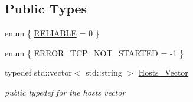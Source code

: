 \subsection*{Public Types}
\begin{DoxyCompactItemize}
\item 
enum \{ \hyperlink{classMadara_1_1Transport_1_1TCP__Transport_a3a52ca4cbe3c568232ce3ce8a835974ca2d61332f904295fa39f255246d4dcdbc}{RELIABLE} =  0
 \}
\item 
enum \{ \hyperlink{classMadara_1_1Transport_1_1TCP__Transport_a8a28c6b0246c68c91b7e7fc6c22c9dfaa808b41bfbf7b650e294ba73b83a398ee}{ERROR\_\-TCP\_\-NOT\_\-STARTED} =  -\/1
 \}
\item 
typedef std::vector$<$ std::string $>$ \hyperlink{classMadara_1_1Transport_1_1Base_a2957ae0c413e07b7e276ae69ef1c320a}{Hosts\_\-Vector}
\begin{DoxyCompactList}\small\item\em public typedef for the hosts vector \item\end{DoxyCompactList}\end{DoxyCompactItemize}
